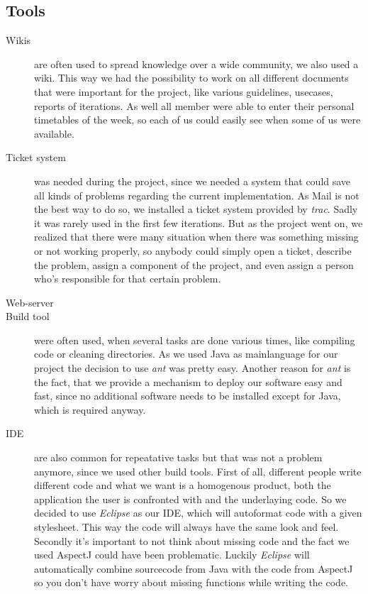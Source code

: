 \subsection{Tools}
\begin{description}

\item[Wikis] are often used to spread knowledge over a wide community, we also used a wiki. This way we had the possibility to work on all different documents that were important for the project, like various guidelines, usecases, reports of iterations. As well all member were able to enter their personal timetables of the week, so each of us could easily see when some of us were available. 

\item[Ticket system] was needed during the project, since we needed a system that could save all kinds of problems regarding the current implementation. As Mail is not the best way to do so, we installed a ticket system provided by \emph{trac}. Sadly it was rarely used in the first few iterations. But as the project went on, we realized that there were many situation when there was something missing or not working properly, so anybody could simply open a ticket, describe the problem, assign a component of the project, and even assign a person who's responsible for that certain problem. 

\item[Web-server] 

\item[Build tool] were often used, when several tasks are done various times, like compiling code or cleaning directories. As we used Java as mainlanguage for our project the decision to use \emph{ant} was pretty easy. Another reason for \emph{ant} is the fact, that we provide a mechanism to deploy our software easy and fast, since no additional software needs to be installed except for Java, which is required anyway.

\item[IDE] are also common for repeatative tasks but that was not a problem anymore, since we used other build tools. First of all, different people write different code and what we want is a homogenous product, both the application the user is confronted with and the underlaying code. So we decided to use \emph{Eclipse} as our IDE, which will autoformat code with a given stylesheet. This way the code will always have the same look and feel. Secondly it's important to not think about missing code and the fact we used AspectJ could have been problematic. Luckily \emph{Eclipse} will automatically combine sourcecode from Java with the code from AspectJ so you don't have worry about missing functions while writing the code.


\end{description}
